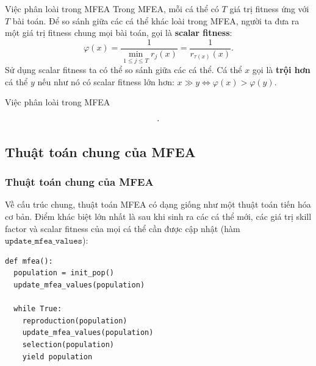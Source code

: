 \begin{frame}{Việc phân loài trong MFEA}
  Trong MFEA, mỗi cá thể có \( T \) giá trị fitness ứng với \( T \) bài toán. Để
  so sánh giữa các cá thể khác loài trong MFEA, người ta đưa ra một giá trị
  fitness chung mọi bài toán, gọi là \textbf{scalar fitness}:
  \[
    \varphi(x) = \frac{1}{\min\limits_{1 \le j \le  T} r_{j}(x)}=
    \frac{1}{r_{\tau (x)}(x)}
  .\] 
  Sử dụng scalar fitness ta có thể so sánh giữa các cá thể. Cá thể \( x \) gọi
  là \textbf{trội hơn} cá thể \( y \) nếu như nó có scalar fitness lớn hơn: \( x
  \gg y \iff \varphi(x) > \varphi(y) \).
\end{frame}

\begin{frame}{Việc phân loài trong MFEA}
  \[
    \begin{array}{c| c c c c}
      
    \end{array}
  .\] 
\end{frame}

\subsection{Thuật toán chung của MFEA} %
\label{sub:Thuật toán chung của MFEA}

\begin{frame}[fragile]
\frametitle{Thuật toán chung của MFEA}
Về cấu trúc chung, thuật toán MFEA có dạng giống như một thuật toán tiến hóa cơ
bản. Điểm khác biệt lớn nhất là sau khi sinh ra các cá thể mới, các giá trị
skill factor và scalar fitness của mọi cá thể cần được cập nhật (hàm
$\texttt{update\_mfea\_values}$):
\begin{verbatim}
def mfea():
  population = init_pop()
  update_mfea_values(population)

  while True:
    reproduction(population)
    update_mfea_values(population)
    selection(population)
    yield population
\end{verbatim}
\end{frame}

